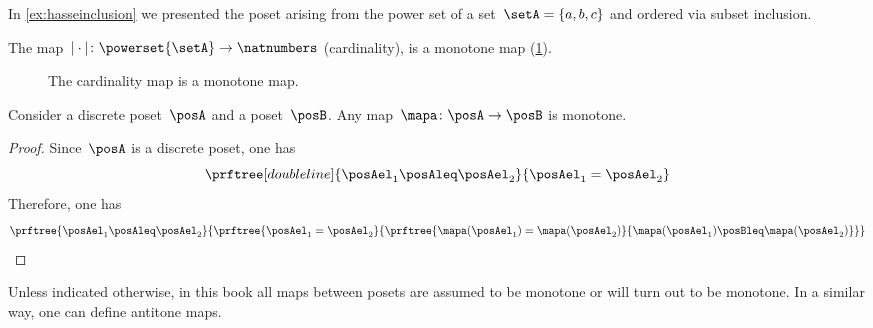 \begin{example}
    In \cref{ex:hasseinclusion} we presented the poset arising from the power set of a set~$\setA=\{a,b,c\}$ and ordered via subset inclusion.

    The map~$\vert \cdot \vert \colon \powerset{\setA} \to \natnumbers$ (cardinality), is a monotone map (\cref{fig:cardinality}).
    \begin{figure}[h!]
        \centering
        \caption{The cardinality map is a monotone map. }
        \label{fig:cardinality}
    \end{figure}
\end{example}

\begin{lemma}
    Consider a discrete poset~$\posA$ and a poset~$\posB$.
    Any map~$\mapa \colon \posA\to \posB$ is monotone.
\end{lemma}
\begin{proof}
    Since~$\posA$ is a discrete poset, one has
    \begin{equation}
        \prftree[double line]{\posAel_1\posAleq \posAel_2}{\posAel_1=\posAel_2}
    \end{equation}
    Therefore, one has
    \begin{equation}
        \prftree{\posAel_1\posAleq \posAel_2}{\prftree{\posAel_1=\posAel_2}{\prftree{\mapa(\posAel_1)=\mapa(\posAel_2)}{\mapa(\posAel_1)\posBleq \mapa(\posAel_2)}}}
    \end{equation}
\end{proof}
Unless indicated otherwise, in this book all maps between posets are assumed to be monotone or will turn out to be monotone.
In a similar way, one can define antitone maps.

